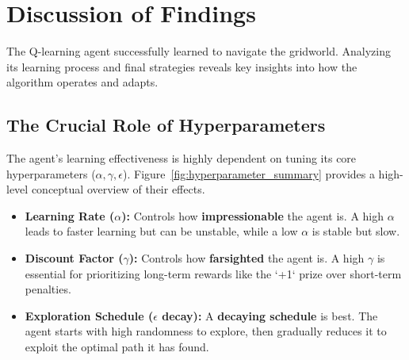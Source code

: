 \documentclass[11pt, a4paper]{article}
\begin{document}
\section{Discussion of Findings}
The Q-learning agent successfully learned to navigate the gridworld. Analyzing its learning process and final strategies reveals key insights into how the algorithm operates and adapts.

\subsection{The Crucial Role of Hyperparameters}
The agent's learning effectiveness is highly dependent on tuning its core hyperparameters ($\alpha, \gamma, \epsilon$). Figure~\ref{fig:hyperparameter_summary} provides a high-level conceptual overview of their effects.

\begin{itemize}
    \item \textbf{Learning Rate ($\alpha$):} Controls how \textbf{impressionable} the agent is. A high $\alpha$ leads to faster learning but can be unstable, while a low $\alpha$ is stable but slow.
    
    \item \textbf{Discount Factor ($\gamma$):} Controls how \textbf{farsighted} the agent is. A high $\gamma$ is essential for prioritizing long-term rewards like the `+1` prize over short-term penalties.
    
    \item \textbf{Exploration Schedule ($\epsilon$ decay):} A \textbf{decaying schedule} is best. The agent starts with high randomness to explore, then gradually reduces it to exploit the optimal path it has found.
\end{itemize}
\end{document}
